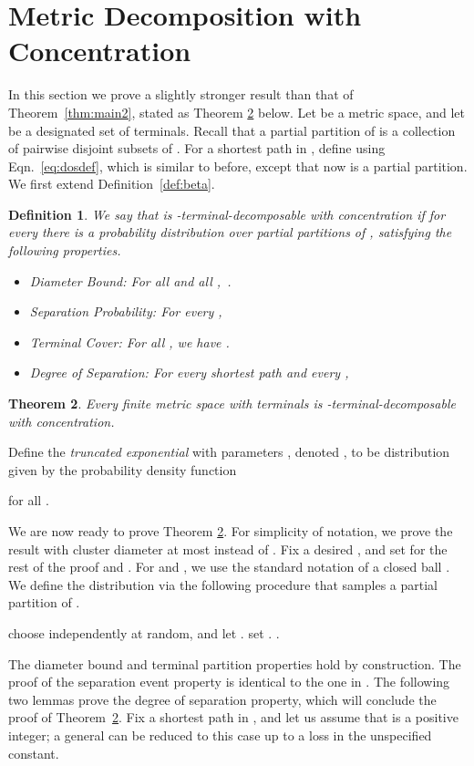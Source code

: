 \documentclass[twoside,leqno,twocolumn]{article}
\newtheorem{definition}[Definition]{Definition}
\newtheorem{theorem}{Theorem}[section]
\newtheorem{definition}[theorem]{Definition}
\def\compactify{\itemsep=0pt \topsep=0pt \partopsep=0pt \parsep=0pt}
\begin{document}
\section{Metric Decomposition with Concentration} \label{sec:main2}

In this section we prove a slightly stronger result than that of Theorem~\ref{thm:main2},
stated as Theorem \ref{thm:main3} below. 
Let  be a metric space, and let  
be a designated set of terminals.
Recall that a partial partition  of  
is a collection of pairwise disjoint subsets of . 
For a shortest path  in ,
define  using Eqn.~\eqref{eq:dosdef},
which is similar to before, except that now  is a partial partition.
We first extend Definition~\ref{def:beta}.

\begin{definition}
We say that  is {\em -terminal-decomposable with concentration} if for every  there is a probability distribution  over partial partitions of , satisfying the following properties.
\begin{itemize} \compactify
	\item {\em Diameter Bound:} For all  and all ,\ .
	\item {\em Separation Probability:} For every , 
	\item {\em Terminal Cover:} For all , we have \mbox{}.
	\item {\em Degree of Separation:} For every shortest path  and every , 
          

\end{itemize}
\end{definition}

\begin{theorem} \label{thm:main3}
Every finite metric space with  terminals 
is -terminal-decomposable with concentration.
\end{theorem}

Define the {\em truncated exponential} with parameters , 
denoted ,
to be distribution given by the probability density function 

for all . 

We are now ready to prove Theorem \ref{thm:main3}. For simplicity of notation, we prove the result with cluster diameter at most  instead of .
Fix a desired ,
and set for the rest of the proof  
and . 
For  and , we use the standard notation of a closed ball
. 
We define the distribution  via the following procedure that samples 
a partial partition  of .
\begin{algorithm}[H]
\begin{algorithmic}[1]
\FOR{}
\STATE choose  independently at random, and let .
\STATE set .
\ENDFOR
\RETURN .
\end{algorithmic}
\end{algorithm}
The diameter bound and terminal partition properties hold by construction. The proof of the separation event property is identical to the one in \cite[Section 3]{Bartal96}.
The following two lemmas prove the degree of separation property, 
which will conclude the proof of Theorem~\ref{thm:main3}. 
Fix a shortest path  in ,
and let us assume that  is a positive integer;
a general  can be reduced to this case up to a loss
in the unspecified constant.
\end{document}

